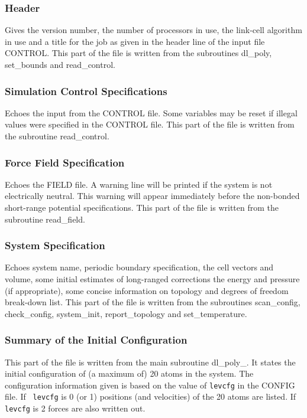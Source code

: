 \subsubsection{Header}

Gives the \D version number, the number of processors in use, the
link-cell algorithm in use and a title for the job as given in the
header line of the input file CONTROL.  This part of the file is
written from the subroutines {\sc dl\_poly}, {\sc set\_bounds}
and {\sc read\_control}.

\subsubsection{Simulation Control Specifications}

Echoes the input from the CONTROL file.  Some variables may be
reset if illegal values were specified in the CONTROL file.  This
part of the file is written from the subroutine {\sc
read\_control}.

\subsubsection{Force Field Specification}

Echoes the FIELD file.  A warning line will be printed if the
system is not electrically neutral.  This warning will appear
immediately before the non-bonded short-range potential
specifications.  This part of the file is written from the
subroutine {\sc read\_field}.

\subsubsection{System Specification}

Echoes system name, periodic boundary specification, the cell
vectors and volume, some initial estimates of long-ranged
corrections the energy and pressure (if appropriate), some
concise information on topology and degrees of freedom
break-down list.  This part of the file is written from the
subroutines {\sc scan\_config}, {\sc check\_config},
{\sc system\_init}, {\sc report\_topology} and
{\sc set\_temperature}.

\subsubsection{Summary of the Initial Configuration}

This part of the file is written from the main subroutine {\sc
dl\_poly\_}.  It states the initial configuration of (a maximum
of) 20 atoms in the system.  The configuration information given
is based on the value of {\tt levcfg} in the CONFIG file.  If {\tt
levcfg} is 0 (or 1) positions (and velocities) of the 20 atoms are
listed.  If {\tt levcfg} is 2 forces are also written out.

